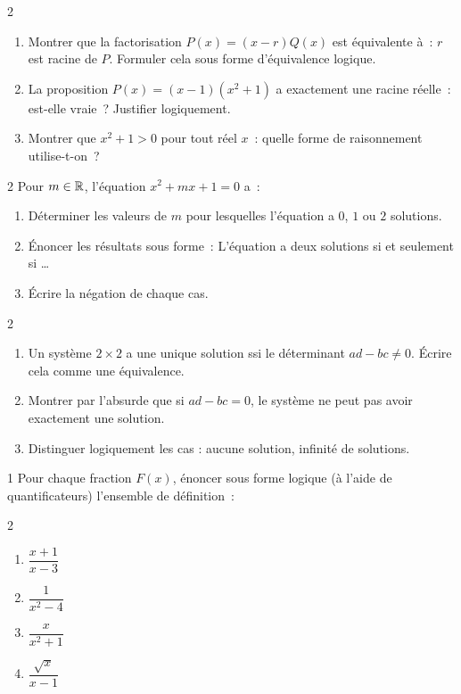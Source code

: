 \begin{bilan}
\begin{exo}{2}
\begin{enumerate}
  \item Montrer que la factorisation $P(x)=(x-r)Q(x)$ est
        \'equivalente \`a~: $r$ est racine de $P$.
        Formuler cela sous forme d'\'equivalence logique.
  \item La proposition \og $P(x)=(x-1)(x^2+1)$ a exactement une racine r\'eelle\fg~:
        est-elle vraie~? Justifier logiquement.
  \item Montrer que $x^2+1>0$ pour tout r\'eel $x$~:
        quelle forme de raisonnement utilise-t-on~?
\end{enumerate}
\end{exo}

\begin{exo}{2}
Pour $m\in\mathbb{R}$, l'\'equation $x^2+mx+1=0$ a~:
\begin{enumerate}
  \item D\'eterminer les valeurs de $m$ pour lesquelles l'\'equation a
        $0$, $1$ ou $2$ solutions.
  \item \'Enoncer les r\'esultats sous forme~:
        \og L'\'equation a deux solutions si et seulement si \ldots\fg
  \item \'Ecrire la n\'egation de chaque cas.
\end{enumerate}
\end{exo}

\begin{exo}{2}
\begin{enumerate}
  \item Un syst\`eme $2\times2$ a une unique solution ssi le d\'eterminant
        $ad-bc\ne0$. \'Ecrire cela comme une \'equivalence.
  \item Montrer par l'absurde que si $ad-bc=0$, le syst\`eme ne peut pas
        avoir exactement une solution.
  \item Distinguer logiquement les cas : aucune solution, infinit\'e de solutions.
\end{enumerate}
\end{exo}

\begin{exo}{1}
Pour chaque fraction $F(x)$, \'enoncer sous forme logique
(\`a l'aide de quantificateurs) l'ensemble de d\'efinition~:
\begin{multicols}{2}
\begin{enumerate}
  \item $\dfrac{x+1}{x-3}$
  \item $\dfrac{1}{x^2-4}$
  \item $\dfrac{x}{x^2+1}$
  \item $\dfrac{\sqrt{x}}{x-1}$
\end{enumerate}
\end{multicols}
\end{exo}


\end{bilan}
